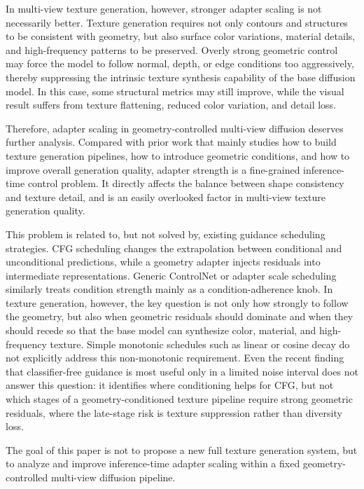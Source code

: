 \documentclass[times,twocolumn,final]{elsarticle}
\providecommand{\DIFadd}[1]{{\protect\color{blue} \sf #1}} %
\providecommand{\DIFaddbegin}{} %
\providecommand{\DIFaddend}{} %
\newcommand{\DIFaddincludegraphics}[2][]{{\color{blue}\fbox{\DIFOincludegraphics[#1]{#2}}}} %
\DeclareRobustCommand{\DIFaddbegin}{\DIFOaddbegin \let\includegraphics\DIFaddincludegraphics} %
\DeclareRobustCommand{\DIFaddend}{\DIFOaddend \let\includegraphics\DIFOincludegraphics} %
\begin{document}
In multi-view texture generation, however, stronger adapter scaling is not necessarily better. Texture generation requires not only contours and structures to be consistent with geometry, but also surface color variations, material details, and high-frequency patterns to be preserved. Overly strong geometric control may force the model to follow normal, depth, or edge conditions too aggressively, thereby suppressing the intrinsic texture synthesis capability of the base diffusion model. In this case, some structural metrics may still improve, while the visual result suffers from texture flattening, reduced color variation, and detail loss.

Therefore, adapter scaling in geometry-controlled multi-view diffusion deserves further analysis. Compared with prior work that mainly studies how to build texture generation pipelines, how to introduce geometric conditions, and how to improve overall generation quality, adapter strength is a fine-grained inference-time control problem. It directly affects the balance between shape consistency and texture detail, and is an easily overlooked factor in multi-view texture generation quality.

This problem is related to, but not solved by, existing guidance scheduling strategies. CFG scheduling changes the extrapolation between conditional and unconditional predictions, while a geometry adapter injects residuals into intermediate representations. Generic ControlNet or adapter scale scheduling similarly treats condition strength mainly as a condition-adherence knob. In texture generation, however, the key question is not only how strongly to follow the geometry, but also when geometric residuals should dominate and when they should recede so that the base model can synthesize color, material, and high-frequency texture. Simple monotonic schedules such as linear or cosine decay do not explicitly address this non-monotonic requirement. \DIFaddbegin \DIFadd{Even the recent finding that classifier-free guidance is most useful only in a limited noise interval \cite{kynkanniemi2024limited} does not answer this question: it identifies where conditioning helps for CFG, but not which stages of a geometry-conditioned texture pipeline require strong geometric residuals, where the late-stage risk is texture suppression rather than diversity loss.
}\DIFaddend

The goal of this paper is not to propose a new full texture generation system, but to analyze and improve inference-time adapter scaling within a fixed geometry-controlled multi-view diffusion pipeline.
\end{document}
